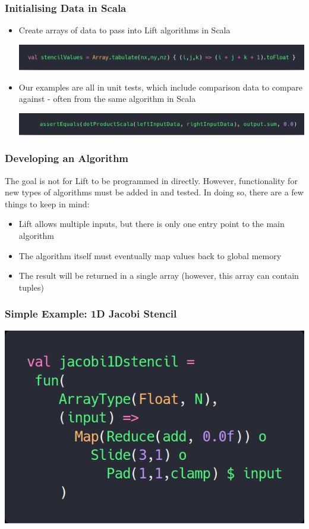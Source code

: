 \documentclass[10pt]{beamer}
\begin{document}
\begin{frame}
\frametitle{Initialising Data in Scala}
\begin{itemize}
    \item Create arrays of data to pass into Lift algorithms in Scala 
\begin{block}{}
    \begin{center}
         \includegraphics[width=.85\textwidth]{../images/scalaArrays.png}
    \end{center}
\end{block}
    \item Our examples are all in unit tests, which include comparison data to compare against - often from the same algorithm in Scala 
    \begin{block}{}
        \begin{center}
            \includegraphics[width=.85\textwidth]{../images/unitTestData.png}
        \end{center}
    \end{block}
\end{itemize}
\end{frame}

\begin{frame}
\frametitle{Developing an Algorithm}
The goal is not for Lift to be programmed in directly. However, functionality for new types of algorithms must be added in and tested. In doing so, there are a few things to keep in mind: 
\begin{itemize}
    \item Lift allows multiple inputs, but there is only one entry point to the main algorithm
    \item The algorithm itself must eventually map values back to global memory
    \item The result will be returned in a single array (however, this array can contain tuples)
\end{itemize}
\end{frame}

\begin{frame}
\frametitle{Simple Example: 1D Jacobi Stencil}
\begin{block}{}
    \begin{center}
    \includegraphics[width=.5\textwidth]{../images/jacobi1Dstencil.png}
    \end{center}
\end{block}
\end{frame}
\end{document}
